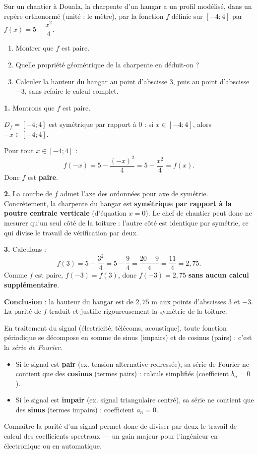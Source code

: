 \documentclass[11pt]{article}
\begin{document}
\begin{exoresolu}
Sur un chantier à Douala, la charpente d'un hangar a un profil modélisé, dans un repère orthonormé (unité : le mètre), par la fonction $f$ définie sur $[-4 ; 4]$ par $f(x) = 5 - \dfrac{x^2}{4}$.
\begin{enumerate}
\item Montrer que $f$ est paire.
\item Quelle propriété géométrique de la charpente en déduit-on ?
\item Calculer la hauteur du hangar au point d'abscisse $3$, puis au point d'abscisse $-3$, sans refaire le calcul complet.
\end{enumerate}
\tcblower
\textbf{1.} Montrons que $f$ est paire.

$D_f = [-4 ; 4]$ est symétrique par rapport à $0$ : si $x \in [-4 ; 4]$, alors $-x \in [-4 ; 4]$.

Pour tout $x \in [-4 ; 4]$ :
\[ f(-x) = 5 - \frac{(-x)^2}{4} = 5 - \frac{x^2}{4} = f(x). \]
Donc $f$ est \textbf{paire}.

\textbf{2.} La courbe de $f$ admet l'axe des ordonnées pour axe de symétrie. Concrètement, la charpente du hangar est \textbf{symétrique par rapport à la poutre centrale verticale} (d'équation $x = 0$). Le chef de chantier peut donc ne mesurer qu'un seul côté de la toiture : l'autre côté est identique par symétrie, ce qui divise le travail de vérification par deux.

\textbf{3.} Calculons :
\[ f(3) = 5 - \frac{3^2}{4} = 5 - \frac{9}{4} = \frac{20 - 9}{4} = \frac{11}{4} = 2,75. \]
Comme $f$ est paire, $f(-3) = f(3)$, donc $f(-3) = 2,75$ \textbf{sans aucun calcul supplémentaire}.

\textbf{Conclusion} : la hauteur du hangar est de $2,75$ m aux points d'abscisses $3$ et $-3$. La parité de $f$ traduit et justifie rigoureusement la symétrie de la toiture.
\end{exoresolu}

\begin{savaistu}
En traitement du signal (électricité, télécoms, acoustique), toute fonction périodique se décompose en somme de sinus (impairs) et de cosinus (pairs) : c'est la \emph{série de Fourier}.
\begin{itemize}
\item Si le signal est \textbf{pair} (ex. tension alternative redressée), sa série de Fourier ne contient que des \textbf{cosinus} (termes pairs) : calculs simplifiés (coefficient $b_n = 0$).
\item Si le signal est \textbf{impair} (ex. signal triangulaire centré), sa série ne contient que des \textbf{sinus} (termes impairs) : coefficient $a_n = 0$.
\end{itemize}
Connaître la parité d'un signal permet donc de diviser par deux le travail de calcul des coefficients spectraux — un gain majeur pour l'ingénieur en électronique ou en automatique.
\end{savaistu}
\end{document}
